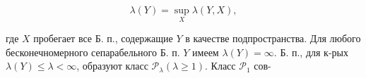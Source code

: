 \documentclass[10pt]{article}
\begin{document}
\[

\lambda(Y)=\sup _{X} \lambda(Y, X),

\]



где $X$ пробегает все Б. п., содержащие $Y$ в качестве подпространства. Для любого бесконечномерного сепарабельного Б. п. $Y$ имеем $\lambda(Y)=\infty$. Б. п., для к-рых $\lambda(Y) \leqslant \lambda<\infty$, образуют класс $\mathscr{P}_{\lambda}(\lambda \geqslant 1)$. Класс $\mathscr{P}_{1}$ сов-
\end{document}

